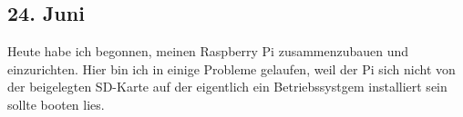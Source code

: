 \subsection{24. Juni}
Heute habe ich begonnen, meinen Raspberry Pi zusammenzubauen und einzurichten. Hier bin ich in einige Probleme gelaufen, weil der Pi sich nicht von der beigelegten SD-Karte auf der eigentlich ein Betriebssystgem installiert sein sollte booten lies.